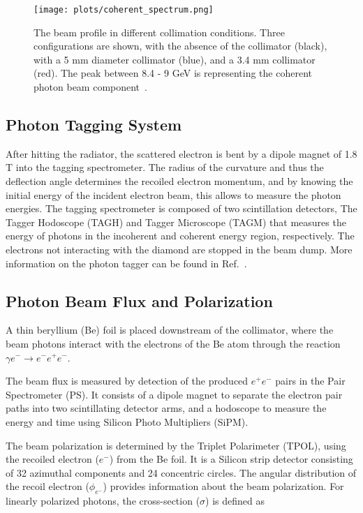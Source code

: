 {\begin{figure}[H]
    \centering
        \texttt{[image: plots/coherent\_spectrum.png]}
        \caption{The beam profile in different collimation conditions. Three configurations are shown, with the absence of the collimator (black), with a 5 mm diameter collimator (blue), and a 3.4 mm collimator (red). The peak between 8.4 - 9 GeV is representing the coherent photon beam component~\cite{GlueX97}.}
        \label{fig.2.1.1}
\end{figure}

\subsection{Photon Tagging System}
\label{p.2.1.2}

After hitting the radiator, the scattered electron is bent by a dipole magnet of 1.8 T into the tagging spectrometer. The radius of the curvature and thus the deflection angle determines the recoiled electron momentum, and by knowing the initial energy of the incident electron beam, this allows to measure the photon energies. The tagging spectrometer is composed of two scintillation detectors, The Tagger Hodoscope (TAGH) and Tagger Microscope (TAGM) that measures the energy of photons in the incoherent and coherent energy region, respectively. The electrons not interacting with the diamond are stopped in the beam dump. More information on the photon tagger can be found in Ref.~\cite{GlueX97}.

\subsection{Photon Beam Flux and Polarization}
\label{p.2.1.3}

A thin beryllium (Be) foil is placed downstream of the collimator, where the beam photons interact with the electrons of the Be atom through the reaction $\gamma e^- \rightarrow e^-e^+e^-$.
~\par The beam flux is measured by detection of the produced $e^+e^-$ pairs in the Pair Spectrometer (PS). It consists of a dipole magnet to separate the electron pair paths into two scintillating detector arms, and a hodoscope to measure the energy and time using Silicon Photo Multipliers (SiPM).
~\par The beam polarization is determined by the Triplet Polarimeter (TPOL), using the recoiled electron ($e^-$) from the Be foil. It is a Silicon strip detector consisting of 32 azimuthal components and 24 concentric circles. The angular distribution of the recoil electron ($\phi_{e^-}$) provides information about the beam polarization. For linearly polarized photons, the cross-section ($\sigma$) is defined as

}

